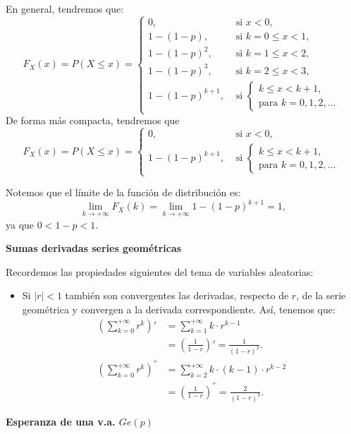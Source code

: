 \documentclass[
  letterpaper,
  DIV=11,
  numbers=noendperiod]{scrreprt}
\providecommand{\tightlist}{%
  \setlength{\itemsep}{0pt}\setlength{\parskip}{0pt}}\usepackage{longtable,booktabs,array}
\begin{document}
En general, tendremos que: \[
F_X(x)=P(X\leq x)=
\left\{\begin{array}{ll} 
0, & \mbox{ si } x<0,\\
1- (1-p),  & \mbox{ si } k=0\leq x <1,\\
1- (1-p)^2, & \mbox{ si } k=1\leq x <2,\\
1- (1-p)^3, & \mbox{ si } k=2\leq x <3,\\
1- (1-p)^{k+1}, & \mbox{ si } \left\{ \begin{array}{l}k\leq x< k+1,\\\mbox{para } k=0,1,2,\ldots\end{array}
    \right.\end{array}\right.
\] De forma más compacta, tendremos que \[
F_X(x)=P(X\leq x)=
\left\{\begin{array}{ll} 
0, & \mbox{ si } x<0,\\
1- (1-p)^{k+1}, & \mbox{ si } \left\{ \begin{array}{l}k\leq x< k+1,\\\mbox{para } k=0,1,2,\ldots\end{array}
    \right.\end{array}
    \right.
\]

Notemos que el límite de la función de distribución es: \[
\displaystyle\lim_{k\to +\infty } F_X(k)=\lim_{k\to +\infty } 1-(1-p)^{k+1}=
1,
\] ya que \(0<1-p<1\).

\textbf{Sumas derivadas series geométricas}

Recordemos las propiedades siguientes del tema de variables aleatorias:

\begin{itemize}
\tightlist
\item
  Si \(|r|<1\) también son convergentes las derivadas, respecto de
  \(r\), de la serie geométrica y convergen a la derivada
  correspondiente. Así, tenemos que: \[
  \begin{array}{ll}
  \left(\sum_{k=0}^{+\infty} r^k\right)' &= \sum_{k=1}^{+\infty}k\cdot
  r^{k-1}\\
  &= \left(\frac{1}{1-r}\right)'=\frac{1}{(1-r)^2}.\\
  \left(\sum_{k=0}^{+\infty} r^k\right)^{''} &= \sum_{k=2}^{+\infty}k \cdot(k-1)\cdot r^{k-2} \\
  &= \left(\frac{1}{1-r}\right)^{''}=\frac{2}{(1-r)^3}.
  \end{array}
  \]
\end{itemize}

\textbf{Esperanza de una v.a. \(Ge(p)\)}
\end{document}
